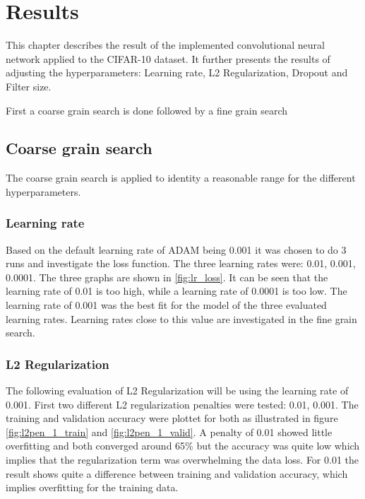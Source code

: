 \chapter{Results}
\label{chp:res}

This chapter describes the result of the implemented convolutional neural network applied to the CIFAR-10 dataset. It further presents the results of adjusting the hyperparameters: Learning rate, L2 Regularization, Dropout and Filter size.

First a coarse grain search is done followed by a fine grain search

\section{Coarse grain  search}
The coarse grain search is applied to identity a reasonable range for the different hyperparameters.

\subsection{Learning rate}
Based on the default learning rate of ADAM being 0.001 it was chosen to do 3 runs and investigate the loss function. The three learning rates were: 0.01, 0.001, 0.0001. The three graphs are shown in \ref{fig:lr_loss}. It can be seen that the learning rate of 0.01 is too high, while a learning rate of 0.0001 is too low. The learning rate of 0.001 was the best fit for the model of the three evaluated learning rates. Learning rates close to this value are investigated in the fine grain search.
	

\FloatBarrier
\subsection{L2 Regularization}
The following evaluation of L2 Regularization will be using the learning rate of 0.001. First two different L2 regularization penalties were tested: 0.01, 0.001.  The training and validation accuracy were plottet for both as illustrated in figure \ref{fig:l2pen_1_train} and \ref{fig:l2pen_1_valid}. A penalty of 0.01 showed little overfitting and both converged around 65\% but the accuracy was quite low which implies that the regularization term was overwhelming the data loss. For 0.01 the result shows quite a difference between training and validation accuracy, which implies overfitting for the training data. 


